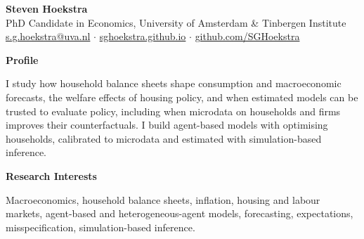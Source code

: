 \documentclass[11pt,a4paper]{article}
\newcommand{\cvsection}[1]{%
  \par\Needspace{5\baselineskip}\vspace{0.8em}%
  {\sffamily\bfseries\color{accent}\fontsize{11.8}{14}\selectfont #1\par}%
  \vspace{0.25em}{\color{rule}\hrule height 0.35pt}\vspace{0.5em}%
}
\begin{document}
{\fontsize{30}{34}\selectfont\sffamily\bfseries\color{accent}Steven Hoekstra}\\[0.45em]
{\small
PhD Candidate in Economics, University of Amsterdam \& Tinbergen Institute\\
\href{mailto:s.g.hoekstra@uva.nl}{s.g.hoekstra@uva.nl} \quad$\cdot$\quad
\href{https://sghoekstra.github.io}{sghoekstra.github.io} \quad$\cdot$\quad
\href{https://github.com/SGHoekstra}{github.com/SGHoekstra}
}
\par\vspace{0.3em}

\cvsection{Profile}
\begingroup\fontsize{10.6}{13.4}\selectfont\raggedright
I study how household balance sheets shape consumption and
macroeconomic forecasts, the welfare effects of housing policy, and when estimated models can be trusted to evaluate policy,
including when microdata on households and firms improves their counterfactuals. I build
agent-based models with optimising households, calibrated to microdata and estimated with
simulation-based inference.
\par\endgroup

\cvsection{Research Interests}
\begingroup\fontsize{10.6}{13.4}\selectfont\raggedright
Macroeconomics, household balance sheets, inflation, housing and labour markets, agent-based and
heterogeneous-agent models, forecasting, expectations, misspecification, simulation-based inference.
\par\endgroup
\end{document}

